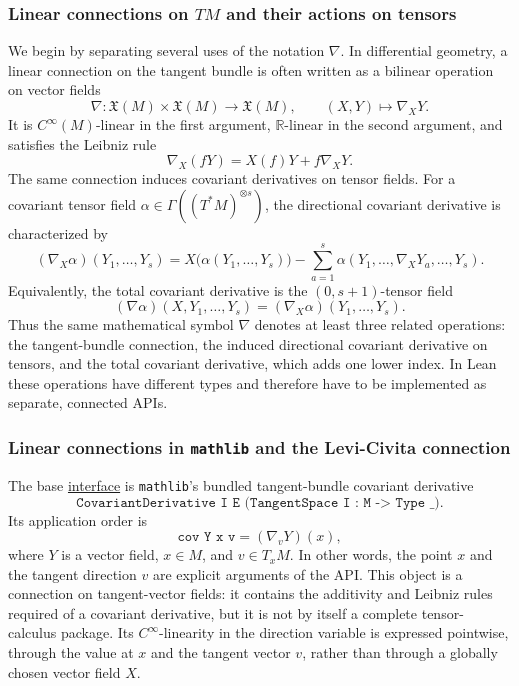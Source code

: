 \documentclass[11pt]{article}
\theoremstyle{plain}
\theoremstyle{definition}
\theoremstyle{remark}
\begin{document}
\subsubsection{Linear connections on \texorpdfstring{$TM$}{TM} and their actions on tensors}

We begin by separating several uses of the notation $\nabla$.  In differential
geometry, a linear connection on the tangent bundle is often written as a
bilinear operation on vector fields
\[
  \nabla : \mathfrak X(M) \times \mathfrak X(M) \to \mathfrak X(M),
  \qquad
  (X,Y) \mapsto \nabla_XY .
\]
It is $C^\infty(M)$-linear in the first argument, $\mathbb R$-linear in the
second argument, and satisfies the Leibniz rule
\[
  \nabla_X(fY) = X(f)Y + f\nabla_XY .
\]
The same connection induces covariant derivatives on tensor fields.  For a
covariant tensor field $\alpha \in \Gamma((T^*M)^{\otimes s})$, the directional
covariant derivative is characterized by
\[
  (\nabla_X\alpha)(Y_1,\ldots,Y_s)
  =
  X\bigl(\alpha(Y_1,\ldots,Y_s)\bigr)
  -
  \sum_{a=1}^s
  \alpha(Y_1,\ldots,\nabla_XY_a,\ldots,Y_s).
\]
Equivalently, the total covariant derivative is the $(0,s+1)$-tensor field
\[
  (\nabla\alpha)(X,Y_1,\ldots,Y_s)
  =
  (\nabla_X\alpha)(Y_1,\ldots,Y_s).
\]
Thus the same mathematical symbol $\nabla$ denotes at least three related
operations: the tangent-bundle connection, the induced directional covariant
derivative on tensors, and the total covariant derivative, which adds one lower
index.  In Lean these operations have different types and therefore have to be
implemented as separate, connected APIs.

\subsubsection{Linear connections in \texttt{mathlib} and the Levi-Civita connection}

The base \href{https://leanprover-community.github.io/mathlib4_docs/Mathlib/Geometry/Manifold/VectorBundle/CovariantDerivative/Basic.html#CovariantDerivative}{interface} is \texttt{mathlib}'s bundled tangent-bundle covariant
derivative
\[
  \texttt{CovariantDerivative I E (TangentSpace I : M -> Type \_)} .
\]
Its application order is
\[
  \texttt{cov Y x v} = (\nabla_vY)(x),
\]
where $Y$ is a vector field, $x\in M$, and $v\in T_xM$.  In other words, the
point $x$ and the tangent direction $v$ are explicit arguments of the API.  This
object is a connection on tangent-vector fields: it contains the additivity and
Leibniz rules required of a covariant derivative, but it is not by itself a
complete tensor-calculus package.  Its $C^\infty$-linearity in the direction
variable is expressed pointwise, through the value at $x$ and the tangent vector
$v$, rather than through a globally chosen vector field $X$.
\end{document}

